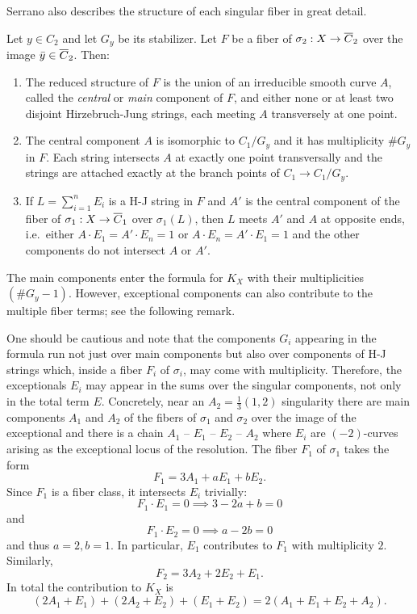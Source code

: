 \documentclass[main.tex]{subfiles}
\begin{document}
Serrano also describes the structure of each singular fiber in great detail. 

\begin{theorem} \cite[Theorem~2.1]{serrano:isotrivial_fibered_surfaces}
Let $y \in C_2$ and let $G_y$ be its stabilizer. Let $F$ be a fiber of $\sigma_2 : X \to \overline{C}_2$ over the image $\bar{y} \in \overline{C}_2$. Then:
\begin{enumerate}
\item The reduced structure of $F$ is the union of an irreducible smooth curve $A$, called the \textit{central} or \textit{main} component of $F$, and either none or at least two disjoint Hirzebruch-Jung strings, each meeting $A$ transversely at one point.
\item The central component $A$ is isomorphic to $C_1 / G_y$ and it has multiplicity $\# G_y$ in $F$. Each string intersects $A$ at exactly one point transversally and the strings are attached exactly at the branch points of $C_1 \to C_1 / G_y$.
\item If $L = \sum_{i = 1}^n E_i$ is a H-J string in $F$ and $A'$ is the central component of the fiber of $\sigma_1 : X \to \overline{C}_1$ over $\sigma_1(L)$, then $L$ meets $A'$ and $A$ at opposite ends, i.e.\, either $A \cdot E_1 = A' \cdot E_n = 1$ or $A \cdot E_n = A' \cdot E_1 = 1$ and the other components do not intersect $A$ or $A'$. 
\end{enumerate}
\end{theorem}

The main components enter the formula for $K_X$ with their multiplicities $(\# G_y  - 1)$. However, exceptional components can also contribute to the multiple fiber terms; see the following remark. 

\begin{rmk}
One should be cautious and note that the components $G_i$ appearing in the formula run not just over main components but also over components of H-J strings which, inside a fiber $F_i$ of $\sigma_i$, may come with multiplicity. Therefore, the exceptionals $E_i$ may appear in the sums over the singular components, not only in the total term $E$. Concretely, near an $A_2 = \tfrac{1}{3}(1,2)$ singularity there are main components $A_1$ and $A_2$ of the fibers of $\sigma_1$ and $\sigma_2$ over the image of the exceptional and there is a chain $A_1$ -- $E_1$ -- $E_2$ -- $A_2$ where $E_i$ are $(-2)$-curves arising as the exceptional locus of the resolution. The fiber $F_1$ of $\sigma_1$ takes the form
\[ F_1 = 3 A_1 + a E_1 + b E_2. \]
Since $F_1$ is a fiber class, it intersects $E_i$ trivially: 
\[ F_1 \cdot E_1 = 0 \implies 3 - 2a + b = 0 \]
and
\[ F_1 \cdot E_2 = 0 \implies a - 2 b = 0 \]
and thus $a = 2, b = 1$. In particular, $E_1$ contributes to $F_1$ with multiplicity $2$. Similarly, 
\[ F_2 = 3 A_2 + 2 E_2 + E_1. \]
In total the contribution to $K_X$ is 
\[ (2 A_1 + E_1) + (2 A_2 + E_2) + (E_1 + E_2) = 2(A_1 + E_1 + E_2 + A_2). \] 
\end{rmk}
\end{document}

